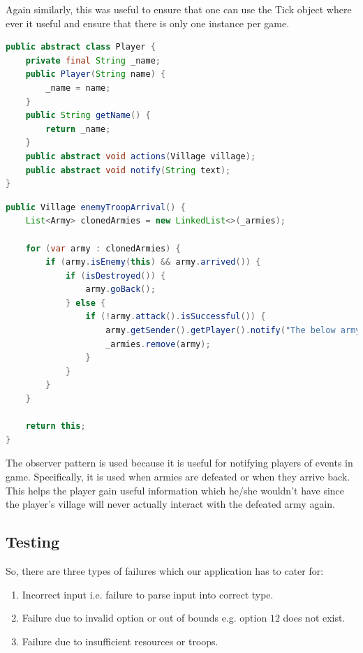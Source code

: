 \documentclass[12pt]{article}
\begin{document}
Again similarly, this was useful to ensure that one can use the
Tick object where ever it useful and ensure that there is only
one instance per game.

\begin{lstlisting}[language=Java, caption={The Player class
(contains the notify for the observer pattern)}]
public abstract class Player {
    private final String _name;
    public Player(String name) {
        _name = name;
    }
    public String getName() {
        return _name;
    }
    public abstract void actions(Village village);
    public abstract void notify(String text);
}
\end{lstlisting}

\begin{lstlisting}[language=Java, caption={\texttt{notify()}
being used to notify the player that a army has been defeated in
Village.java}]
public Village enemyTroopArrival() {
    List<Army> clonedArmies = new LinkedList<>(_armies);
    
    for (var army : clonedArmies) {
        if (army.isEnemy(this) && army.arrived()) {
            if (isDestroyed()) {
                army.goBack();
            } else {
                if (!army.attack().isSuccessful()) {
                    army.getSender().getPlayer().notify("The below army has been defeated\n" + army);
                    _armies.remove(army);
                }
            }
        }
    }
    
    return this;
}
\end{lstlisting}

The observer pattern is used because it is useful for notifying
players of events in game. Specifically, it is used when armies
are defeated or when they arrive back. This helps the player
gain useful information which he/she wouldn't have since the
player's village will never actually interact with the defeated
army again.

\subsection{Testing}

So, there are three types of failures which our application has
to cater for:

\begin{enumerate}
    \item Incorrect input i.e. failure to parse input into
        correct type.
    \item Failure due to invalid option or out of bounds e.g.
        option $12$ does not exist.
    \item Failure due to insufficient resources or troops.
\end{enumerate}
\end{document}
